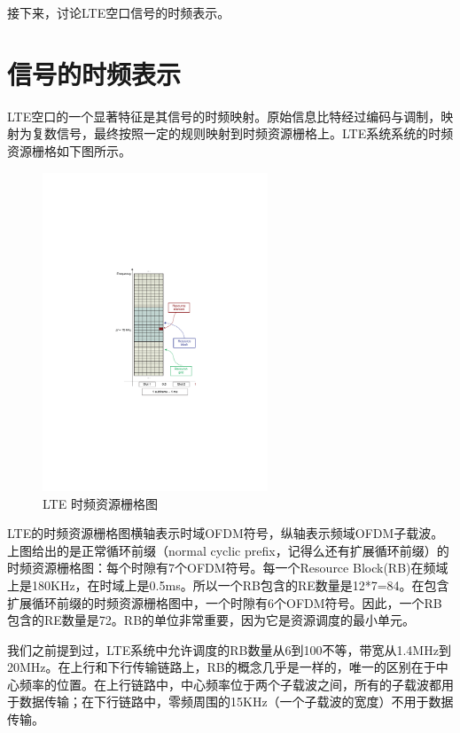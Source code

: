 \documentclass[10pt,a4paper,UTF8]{article}
\begin{document}
接下来，讨论LTE空口信号的时频表示。

\section{信号的时频表示}
\label{sec:orgheadline7}


LTE空口的一个显著特征是其信号的时频映射。原始信息比特经过编码与调制，映射为复数信号，最终按照一定的规则映射到时频资源栅格上。LTE系统系统的时频资源栅格如下图所示。

\begin{figure}[htb]
\centering
\includegraphics[width=0.6\textwidth]{../../img/20151005lte_time_frequency_grid.pdf}
\caption{\label{fig:orgparagraph3}
LTE 时频资源栅格图}
\end{figure}

LTE的时频资源栅格图横轴表示时域OFDM符号，纵轴表示频域OFDM子载波。上图给出的是正常循环前缀（normal cyclic prefix，记得么还有扩展循环前缀）的时频资源栅格图：每个时隙有7个OFDM符号。每一个Resource Block(RB)在频域上是180KHz，在时域上是0.5ms。所以一个RB包含的RE数量是12*7=84。在包含扩展循环前缀的时频资源栅格图中，一个时隙有6个OFDM符号。因此，一个RB包含的RE数量是72。RB的单位非常重要，因为它是资源调度的最小单元。

我们之前提到过，LTE系统中允许调度的RB数量从6到100不等，带宽从1.4MHz到20MHz。在上行和下行传输链路上，RB的概念几乎是一样的，唯一的区别在于中心频率的位置。在上行链路中，中心频率位于两个子载波之间，所有的子载波都用于数据传输；在下行链路中，零频周围的15KHz（一个子载波的宽度）不用于数据传输。
\end{document}
